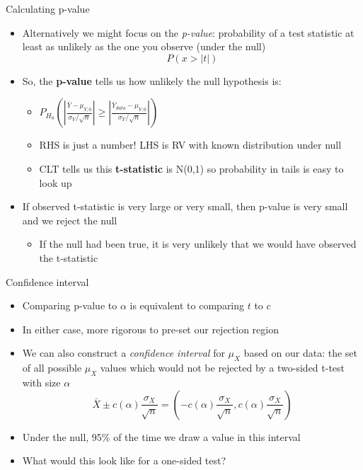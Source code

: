\documentclass[aspectratio=169]{beamer}
\begin{document}
\begin{frame}{Calculating p-value}
    \begin{itemize}
        \item Alternatively we might focus on the \textit{p-value}: probability of a test statistic at least as unlikely as the one you observe (under the null)
            $$ P(x > |t|) $$
        \item So, the \textbf{p-value} tells us how unlikely the null hypothesis is:
        \begin{itemize}
            \item  $P_{H_0}(|\frac{\bar{Y} - \mu_{Y,0}}{\sigma_Y/\sqrt{n}}|\geq |\frac{\bar{Y}_{data} - \mu_{Y,0}}{\sigma_Y/\sqrt{n}}|)$
            \item RHS is just a number! LHS is RV with known distribution under null
            \item CLT tells us this \textbf{t-statistic} is N(0,1) so probability in tails is easy to look up
        \end{itemize}
        \item If observed t-statistic is very large or very small, then p-value is very small and we reject the null
        \begin{itemize}
            \item If the null had been true, it is very unlikely that we would have observed the t-statistic
        \end{itemize}
    \end{itemize}
\end{frame}

\begin{frame}{Confidence interval}
    \begin{itemize}
        \item Comparing p-value to $\alpha$ is equivalent to comparing $t$ to $c$ 
        \item In either case, more rigorous to pre-set our rejection region
        \item We can also construct a \textit{confidence interval} for $\mu_X$ based on our data: the set of all possible $\mu_X$ values which would not be rejected by a two-sided t-test with size $\alpha$
            $$\bar{X} \pm c(\alpha) \frac{\sigma_X}{\sqrt{n}} = \left( -c(\alpha) \frac{\sigma_X}{\sqrt{n}}, c(\alpha) \frac{\sigma_X}{\sqrt{n}}\right)$$
        \item Under the null, 95\% of the time we draw a value in this interval
        \item What would this look like for a one-sided test?
    \end{itemize}
\end{frame}
\end{document}
